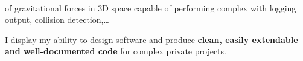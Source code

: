 \documentclass[]{jonas-cv}
\begin{document}
\begin{minipage}[t]{0.63\textwidth}
\\
\begin{tightemize}
    \item {} of gravitational forces in 3D space capable of performing complex  with logging output, collision detection,\dots
    \item[\angleDoubleRightSymbol] I display my ability to design software and produce \textbf{clean, easily extendable and well-documented code} for complex private projects.
\end{tightemize}





\end{minipage}
\end{document}
